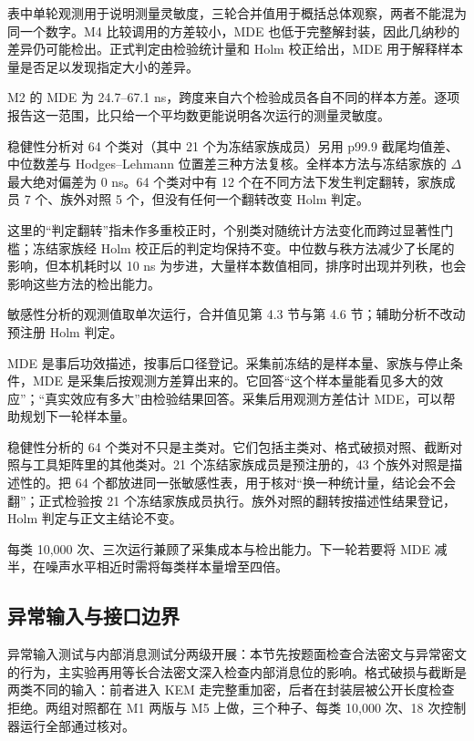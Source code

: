 表中单轮观测用于说明测量灵敏度，三轮合并值用于概括总体观察，两者不能混为同一个数字。M4 比较调用的方差较小，MDE 也低于完整解封装，因此几纳秒的差异仍可能检出。正式判定由检验统计量和 Holm 校正给出，MDE 用于解释样本量是否足以发现指定大小的差异。

M2 的 MDE 为 24.7--67.1 ns，跨度来自六个检验成员各自不同的样本方差。逐项报告这一范围，比只给一个平均数更能说明各次运行的测量灵敏度。

稳健性分析对 64 个类对（其中 21 个为冻结家族成员）另用 p99.9 截尾均值差、中位数差与 Hodges--Lehmann 位置差三种方法复核。全样本方法与冻结家族的 $\Delta$ 最大绝对偏差为 0 ns。64 个类对中有 12 个在不同方法下发生判定翻转，家族成员 7 个、族外对照 5 个，但没有任何一个翻转改变 Holm 判定。%

这里的“判定翻转”指未作多重校正时，个别类对随统计方法变化而跨过显著性门槛；冻结家族经 Holm 校正后的判定均保持不变。中位数与秩方法减少了长尾的影响，但本机耗时以 10 ns 为步进，大量样本数值相同，排序时出现并列秩，也会影响这些方法的检出能力。


敏感性分析的观测值取单次运行，合并值见第 4.3 节与第 4.6 节；辅助分析不改动预注册 Holm 判定。

MDE 是事后功效描述，按事后口径登记。采集前冻结的是样本量、家族与停止条件，MDE 是采集后按观测方差算出来的。它回答“这个样本量能看见多大的效应”；“真实效应有多大”由检验结果回答。采集后用观测方差估计 MDE，可以帮助规划下一轮样本量。

稳健性分析的 64 个类对不只是主类对。它们包括主类对、格式破损对照、截断对照与工具矩阵里的其他类对。21 个冻结家族成员是预注册的，43 个族外对照是描述性的。把 64 个都放进同一张敏感性表，用于核对“换一种统计量，结论会不会翻”；正式检验按 21 个冻结家族成员执行。族外对照的翻转按描述性结果登记，Holm 判定与正文主结论不变。

每类 10,000 次、三次运行兼顾了采集成本与检出能力。下一轮若要将 MDE 减半，在噪声水平相近时需将每类样本量增至四倍。

\subsection{异常输入与接口边界}

异常输入测试与内部消息测试分两级开展：本节先按题面检查合法密文与异常密文的行为，主实验再用等长合法密文深入检查内部消息位的影响。格式破损与截断是两类不同的输入：前者进入 KEM 走完整重加密，后者在封装层被公开长度检查拒绝。两组对照都在 M1 两版与 M5 上做，三个种子、每类 10,000 次、18 次控制器运行全部通过核对。%

